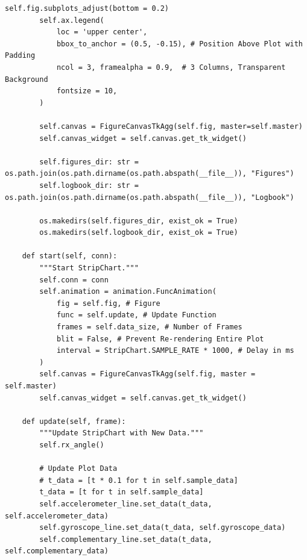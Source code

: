 \documentclass{article}
\begin{document}
\begin{lstlisting}[caption={Source Code : Python Stripchart}, label={lst:stripchart_code}]
        self.fig.subplots_adjust(bottom = 0.2)
        self.ax.legend(
            loc = 'upper center',
            bbox_to_anchor = (0.5, -0.15), # Position Above Plot with Padding
            ncol = 3, framealpha = 0.9,  # 3 Columns, Transparent Background
            fontsize = 10,
        )

        self.canvas = FigureCanvasTkAgg(self.fig, master=self.master)
        self.canvas_widget = self.canvas.get_tk_widget()

        self.figures_dir: str = os.path.join(os.path.dirname(os.path.abspath(__file__)), "Figures")
        self.logbook_dir: str = os.path.join(os.path.dirname(os.path.abspath(__file__)), "Logbook")

        os.makedirs(self.figures_dir, exist_ok = True)
        os.makedirs(self.logbook_dir, exist_ok = True)

    def start(self, conn):
        """Start StripChart."""
        self.conn = conn
        self.animation = animation.FuncAnimation(
            fig = self.fig, # Figure
            func = self.update, # Update Function
            frames = self.data_size, # Number of Frames
            blit = False, # Prevent Re-rendering Entire Plot
            interval = StripChart.SAMPLE_RATE * 1000, # Delay in ms
        )
        self.canvas = FigureCanvasTkAgg(self.fig, master = self.master)
        self.canvas_widget = self.canvas.get_tk_widget()

    def update(self, frame):
        """Update StripChart with New Data."""
        self.rx_angle()

        # Update Plot Data
        # t_data = [t * 0.1 for t in self.sample_data]
        t_data = [t for t in self.sample_data]
        self.accelerometer_line.set_data(t_data, self.accelerometer_data)
        self.gyroscope_line.set_data(t_data, self.gyroscope_data)
        self.complementary_line.set_data(t_data, self.complementary_data)


\end{lstlisting}
\end{document}
